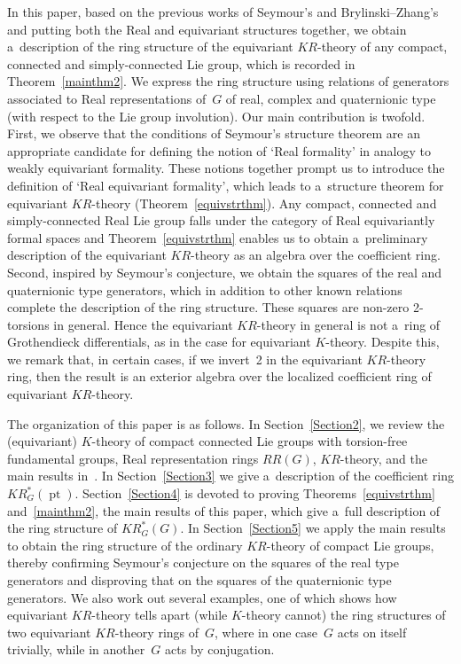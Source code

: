 \documentclass[pdftex]{sigma}
\numberwithin{equation}{section}
\DeclareMathOperator{\pt}{pt}
\begin{document}
In this paper, based on the previous works of Seymour's and Brylinski--Zhang's and putting both the Real and equivariant
structures together, we obtain a~description of the ring structure of the equivariant $KR$-theory of any compact,
connected and simply-connected Lie group, which is recorded in Theorem~\ref{mainthm2}.
We express the ring structure using relations of generators associated to Real representations of~$G$ of real, complex
and quaternionic type (with respect to the Lie group involution).
Our main contribution is twofold.
First, we observe that the conditions of Seymour's structure theorem are an appropriate candidate for def\/ining the
notion of `Real formality' in analogy to weakly equivariant formality.
These notions together prompt us to introduce the def\/inition of `Real equivariant formality', which leads to a~structure
theorem for equivariant $KR$-theory (Theorem~\ref{equivstrthm}).
Any compact, connected and simply-connected Real Lie group falls under the category of Real equivariantly formal spaces
and Theorem~\ref{equivstrthm} enables us to obtain a~preliminary description of the equivariant $KR$-theory as an
algebra over the coef\/f\/icient ring.
Second, inspired by Seymour's conjecture, we obtain the squares of the real and quaternionic type generators, which in
addition to other known relations complete the description of the ring structure.
These squares are non-zero 2-torsions in general.
Hence the equivariant $KR$-theory in general is not a~ring of Grothendieck dif\/ferentials, as in the case for equivariant
$K$-theory.
Despite this, we remark that, in certain cases, if we invert~2 in the equivariant $KR$-theory ring, then the result is
an exterior algebra over the localized coef\/f\/icient ring of equivariant $KR$-theory.

The organization of this paper is as follows.
In Section~\ref{Section2}, we review the (equivariant) $K$-theory of compact connected Lie groups with torsion-free fundamental
groups, Real representation rings $RR(G)$, $KR$-theory, and the main results in~\cite{Se}.
In Section~\ref{Section3} we give a~description of the coef\/f\/icient ring $KR^*_G(\pt)$.
Section~\ref{Section4} is devoted to proving Theorems~\ref{equivstrthm} and~\ref{mainthm2}, the main results of this paper, which
give a~full description of the ring structure of $KR^*_G(G)$.
In Section~\ref{Section5} we apply the main results to obtain the ring structure of the ordinary $KR$-theory of compact Lie groups,
thereby conf\/irming Seymour's conjecture on the squares of the real type generators and disproving that on the squares of
the quaternionic type generators.
We also work out several examples, one of which shows how equivariant $KR$-theory tells apart (while $K$-theory cannot)
the ring structures of two equivariant $KR$-theory rings of~$G$, where in one case~$G$ acts on itself trivially, while
in another~$G$ acts by conjugation.
\end{document}
